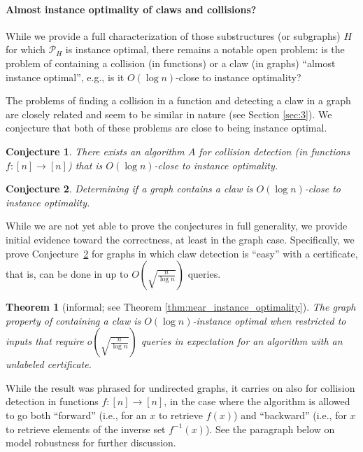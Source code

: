 \documentclass[11pt]{article}
\numberwithin{equation}{section}
\newtheorem{theorem}{Theorem}[section]
\newtheorem{conjecture}[conjecture]{Conjecture}
\renewcommand{\P}{\mathcal{P}}
\newcommand{\1}{\mathbf{1}}
\begin{document}
\paragraph{Almost instance optimality of claws and collisions?}
While we provide a full characterization of those substructures (or subgraphs) $H$ for which $\P_H$ is instance optimal, there remains a notable open problem: is the problem of containing a collision (in functions) or a claw (in graphs) ``almost instance optimal'', e.g., is it $O(\log n)$-close to instance optimality?


The problems of finding a collision in a function and detecting a claw in a graph are closely related and seem to be similar in nature (see Section \ref{sec:3}).
We conjecture that both of these problems are close to being instance optimal. 

\begin{conjecture} \label{conjcollision}
There exists an algorithm $A$ for collision detection (in functions $f \colon [n] \to [n]$) that is $O(\log n)$-close to instance optimality.
\end{conjecture}
\begin{conjecture}
\label{conjgraph}
Determining if a graph contains a claw is $O(\log n)$-close to instance optimality.
\end{conjecture}

While we are not yet able to prove the conjectures in full generality, we provide initial evidence toward the correctness, at least in the graph case. Specifically, we prove Conjecture~\ref{conjgraph} for graphs in which claw detection is ``easy'' with a certificate, that is, can be done in up to $O\left(\sqrt{\frac{n}{\log n}}\right)$ queries.




\begin{theorem}[informal; see Theorem \ref{thm:near_instance_optimality}]
\label{thm:inst_opt_graphs_intro}
The graph property of containing a claw is $O(\log n)$-instance optimal when restricted to inputs that require $o\left(\sqrt{\frac{n}{\log n}}\right)$ queries in expectation for an algorithm with an unlabeled certificate.
\end{theorem}
While the result was phrased for undirected graphs, it carries on also for collision detection in functions $f \colon [n] \to [n]$, in the case where the algorithm is allowed to go both ``forward'' (i.e., for an $x$ to retrieve $f(x)$) and ``backward'' (i.e., for $x$ to retrieve elements of the inverse set $f^{-1}(x)$). See the paragraph below on model robustness for further discussion.
\end{document}
